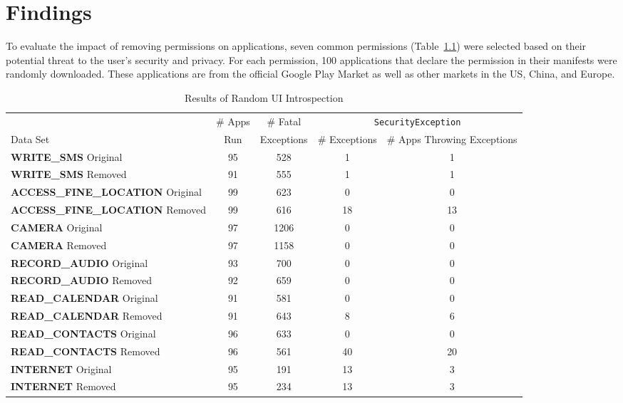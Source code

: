 \chapter{Findings}
\label{sec:evaluation}

To evaluate the impact of removing permissions on applications, seven common permissions (Table~\ref{tbl:results}) were selected based on their potential threat to the user's security and privacy.  For each permission, 100 applications that declare the permission in their manifests were randomly downloaded.  These applications are from the official Google Play Market as well as other markets in the US, China, and Europe.

\begin{table}[t]
\centering
\tiny
\begin{tabular}{|l|c|c|c|c|}
\hline
& \# Apps & \# Fatal & \multicolumn{2}{|c|}{\texttt{SecurityException}} \\ \cline{4-5}
Data Set & Run & Exceptions & \# Exceptions & \# Apps Throwing Exceptions\\ \hline 
{\bfseries \ttfamily WRITE\_SMS} Original & 95 & 528 & 1 & 1 \\ \hline
{\bfseries \ttfamily WRITE\_SMS} Removed & 91 & 555 & 1 & 1 \\ \hline
{\bfseries \ttfamily ACCESS\_FINE\_LOCATION} Original & 99 & 623 & 0 & 0 \\ \hline
{\bfseries \ttfamily ACCESS\_FINE\_LOCATION} Removed & 99 & 616 & 18 & 13 \\ \hline					
{\bfseries \ttfamily CAMERA} Original & 97 & 1206 & 0 & 0 \\ \hline
{\bfseries \ttfamily CAMERA} Removed & 97 & 1158 & 0 & 0 \\ \hline
{\bfseries \ttfamily RECORD\_AUDIO} Original & 93 & 700 & 0 & 0 \\ \hline
{\bfseries \ttfamily RECORD\_AUDIO} Removed & 92 & 659 & 0 & 0 \\ \hline
{\bfseries \ttfamily READ\_CALENDAR} Original & 91 & 581 & 0 & 0 \\ \hline 
{\bfseries \ttfamily READ\_CALENDAR} Removed & 91 & 643 & 8 & 6 \\ \hline
{\bfseries \ttfamily READ\_CONTACTS} Original & 96 & 633 & 0 & 0 \\ \hline
{\bfseries \ttfamily READ\_CONTACTS} Removed & 96 & 561 & 40 & 20 \\ \hline
{\bfseries \ttfamily INTERNET} Original & 95 & 191 & 13 & 3 \\ \hline
{\bfseries \ttfamily INTERNET} Removed & 95 & 234 & 13 & 3 \\ \hline
\end{tabular}
\caption{Results of Random UI Introspection}
\label{tbl:results}
\end{table}


